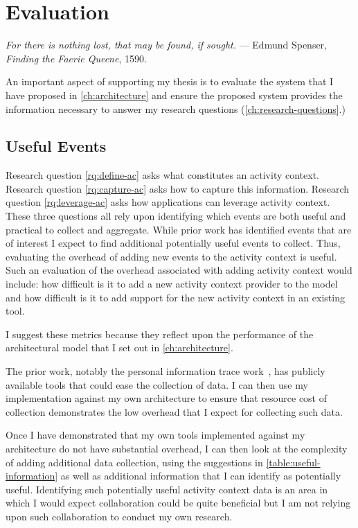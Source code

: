\chapter{Evaluation}
\label{ch:evaluation}

\begin{epigraph}
    \emph{For there is nothing lost, that may be found, if sought.} --- Edmund
    Spenser, \emph{Finding the Faerie Queene}, 1590.
\end{epigraph}

An important aspect of supporting my thesis is to evaluate the system that I
have proposed in \autoref{ch:architecture} and ensure the proposed system
provides the information necessary to answer my research questions
(\autoref{ch:research-questions}.)

\section{Useful Events}
\label{ch:evaluation:sec:events}

Research question \ref{rq:define-ac} asks what constitutes an activity
context. Research question \ref{rq:capture-ac} asks how to capture this
information.  Research question \ref{rq:leverage-ac} asks how applications can
leverage activity context.  These three questions all rely upon identifying
which events are both useful and practical to collect and aggregate. While prior
work has identified events that are of interest I expect to find additional
potentially useful events to collect.  Thus, evaluating the overhead of adding
new events to the activity context is useful.  Such an evaluation of the
overhead associated with adding activity context would include: how difficult is
it to add a new activity context provider to the model and how difficult is it
to add support for the new activity context
in an existing tool.

I suggest these metrics because they reflect upon the performance of the
architectural model that I set out in \autoref{ch:architecture}.

The prior work, notably the personal information trace
work~\cite{vianna2019thesis}, has publicly available tools that could ease the
collection of data. I can then use my implementation against my own architecture
to ensure that resource cost of collection demonstrates the low overhead that I
expect for collecting such data.

Once I have demonstrated that my own tools implemented against my architecture
do not have substantial overhead, I can then look at the complexity of adding
additional data collection, using the suggestions in
\autoref{table:useful-information} as well as additional information that I can
identify as potentially useful.  Identifying such potentially useful activity
context data is an area in which I would expect collaboration could be quite
beneficial but I am not relying upon such collaboration to conduct my own
research.

